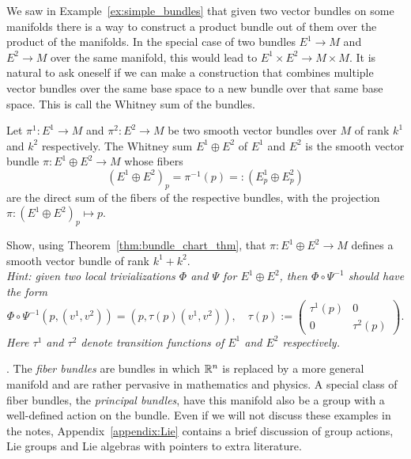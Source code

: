 We saw in Example~\ref{ex:simple_bundles} that given two vector bundles on some manifolds there is a way to construct a product bundle out of them over the product of the manifolds.
In the special case of two bundles $E^1 \to M$ and $E^2 \to M$ over the same manifold, this would lead to $E^1 \times E^2 \to M \times M$.
It is natural to ask oneself if we can make a construction that combines multiple vector bundles over the same base space to a new bundle over that same base space.
This is call the Whitney sum of the bundles.
\begin{exercise}\label{ex:whitney}
	Let $\pi^1 : E^1 \to M$ and $\pi^2 : E^2 \to M$ be two smooth vector bundles over $M$ of rank $k^1$ and $k^2$ respectively.
	The Whitney sum $E^1 \oplus E^2$ of $E^1$ and $E^2$ is the smooth vector bundle $\pi: E^1 \oplus E^2 \to M$ whose fibers
	\begin{equation}
		(E^1 \oplus E^2)_p = \pi^{-1}(p) =: (E^1_p \oplus E^2_p)
	\end{equation}
	are the direct sum of the fibers of the respective bundles, with the projection $\pi: (E^1\oplus E^2)_p \mapsto p$.

	Show, using Theorem~\ref{thm:bundle_chart_thm}, that $\pi: E^1 \oplus E^2 \to M$ defines a smooth vector bundle of rank $k^1 + k^2$.\\
	\textit{\small
		Hint: given two local trivializations $\varPhi$ and $\varPsi$ for $E^1\oplus E^2$, then $\varPhi\circ\varPsi^{-1}$ should have the form
		\begin{equation}
			\varPhi\circ\varPsi^{-1}(p, (v^1, v^2)) = (p, \tau(p)(v^1, v^2)), \quad
			\tau(p) :=
			\begin{pmatrix}
				\tau^1(p) & 0         \\
				0         & \tau^2(p)
			\end{pmatrix}.
		\end{equation}
		Here $\tau^1$ and $\tau^2$ denote transition functions of $E^1$ and $E^2$ respectively.
	}
\end{exercise}

.
The \emph{fiber bundles} are bundles in which $\mathbb{R}^n$ is replaced by a more general manifold and are rather pervasive in mathematics and physics.
A special class of fiber bundles, the \emph{principal bundles}, have this manifold also be a group with a well-defined action on the bundle.
Even if we will not discuss these examples in the notes, Appendix~\ref{appendix:Lie} contains a brief discussion of group actions, Lie groups and Lie algebras with pointers to extra literature.

